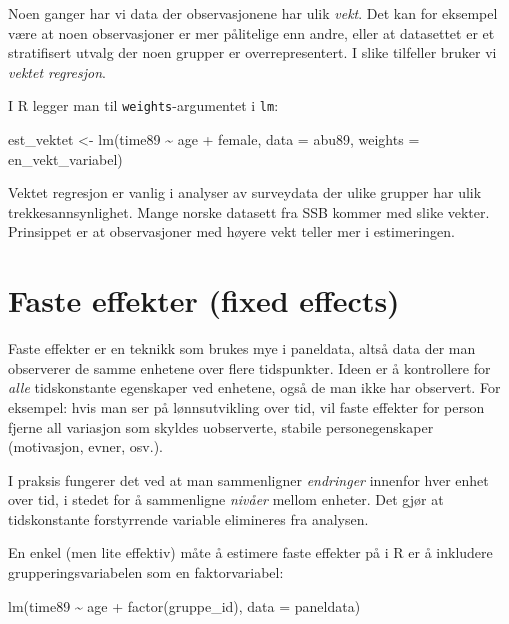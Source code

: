 \documentclass[
  norsk,
  letterpaper,
  DIV=11,
  numbers=noendperiod]{scrreprt}
\newenvironment{Shaded}{\begin{snugshade}}{\end{snugshade}}
\newcommand{\AttributeTok}[1]{\textcolor[rgb]{0.40,0.45,0.13}{#1}}
\newcommand{\FunctionTok}[1]{\textcolor[rgb]{0.28,0.35,0.67}{#1}}
\newcommand{\NormalTok}[1]{\textcolor[rgb]{0.00,0.23,0.31}{#1}}
\newcommand{\OtherTok}[1]{\textcolor[rgb]{0.00,0.23,0.31}{#1}}
\newcommand{\SpecialCharTok}[1]{\textcolor[rgb]{0.37,0.37,0.37}{#1}}
\theoremstyle{definition}
\theoremstyle{remark}
\begin{document}
Noen ganger har vi data der observasjonene har ulik \emph{vekt}. Det kan
for eksempel være at noen observasjoner er mer pålitelige enn andre,
eller at datasettet er et stratifisert utvalg der noen grupper er
overrepresentert. I slike tilfeller bruker vi \emph{vektet regresjon}.

I R legger man til \texttt{weights}-argumentet i \texttt{lm}:

\begin{Shaded}
\begin{Highlighting}[]
\NormalTok{est\_vektet }\OtherTok{\textless{}{-}} \FunctionTok{lm}\NormalTok{(time89 }\SpecialCharTok{\textasciitilde{}}\NormalTok{ age }\SpecialCharTok{+}\NormalTok{ female, }\AttributeTok{data =}\NormalTok{ abu89, }\AttributeTok{weights =}\NormalTok{ en\_vekt\_variabel)}
\end{Highlighting}
\end{Shaded}

Vektet regresjon er vanlig i analyser av surveydata der ulike grupper
har ulik trekkesannsynlighet. Mange norske datasett fra SSB kommer med
slike vekter. Prinsippet er at observasjoner med høyere vekt teller mer
i estimeringen.

\section{Faste effekter (fixed
effects)}\label{faste-effekter-fixed-effects}

Faste effekter er en teknikk som brukes mye i paneldata, altså data der
man observerer de samme enhetene over flere tidspunkter. Ideen er å
kontrollere for \emph{alle} tidskonstante egenskaper ved enhetene, også
de man ikke har observert. For eksempel: hvis man ser på lønnsutvikling
over tid, vil faste effekter for person fjerne all variasjon som skyldes
uobserverte, stabile personegenskaper (motivasjon, evner, osv.).

I praksis fungerer det ved at man sammenligner \emph{endringer} innenfor
hver enhet over tid, i stedet for å sammenligne \emph{nivåer} mellom
enheter. Det gjør at tidskonstante forstyrrende variable elimineres fra
analysen.

En enkel (men lite effektiv) måte å estimere faste effekter på i R er å
inkludere grupperingsvariabelen som en faktorvariabel:

\begin{Shaded}
\begin{Highlighting}[]
\FunctionTok{lm}\NormalTok{(time89 }\SpecialCharTok{\textasciitilde{}}\NormalTok{ age }\SpecialCharTok{+} \FunctionTok{factor}\NormalTok{(gruppe\_id), }\AttributeTok{data =}\NormalTok{ paneldata)}
\end{Highlighting}
\end{Shaded}
\end{document}
